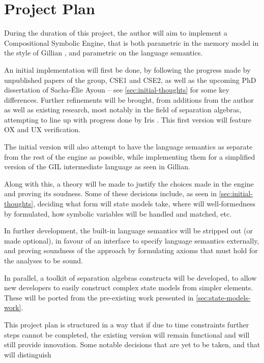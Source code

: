 \chapter{Project Plan}

During the duration of this project, the author will aim to implement a Compositional Symbolic Engine, that is both parametric in the memory model in the style of Gillian \cite{gillian0, gillian1, gillian2}, and parametric on the language semantics.

An initial implementation will first be done, by following the progress made by unpublished papers of the group, CSE1 \cite{cse1} and CSE2, as well as the upcoming PhD dissertation of Sacha-Élie Ayoun \cite{sacha-phd} -- see \autoref{sec:initial-thoughts} for some key differences. Further refinements will be brought, from additions from the author as well as existing research, most notably in the field of separation algebras, attempting to line up with progress done by Iris \cite{iris}. This first version will feature OX and UX verification.

The initial version will also attempt to have the language semantics as separate from the rest of the engine as possible, while implementing them for a simplified version of the GIL intermediate language as seen in Gillian.

Along with this, a theory will be made to justify the choices made in the engine and proving its soudness. Some of these decisions include, as seen in \autoref{sec:initial-thoughts}, deciding what form will state models take, where will well-formedness by formulated, how symbolic variables will be handled and matched, etc.

In further development, the built-in language semantics will be stripped out (or made optional), in favour of an interface to specify language semantics externally, and proving soundness of the approach by formulating axioms that must hold for the analyses to be sound.

In parallel, a toolkit of separation algebras constructs will be developed, to allow new developers to easily construct complex state models from simpler elements. These will be ported from the pre-existing work presented in \autoref{sec:state-models-work}.

This project plan is structured in a way that if due to time constraints further steps cannot be completed, the existing version will remain functional and will still provide innovation. Some notable decisions that are yet to be taken, and that will distinguish

